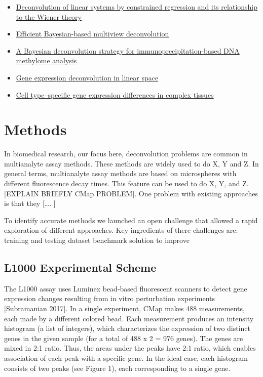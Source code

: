 \documentclass[]{article}
\begin{document}
\begin{itemize}
\item
  \href{https://ieeexplore.ieee.org/abstract/document/4044778}{Deconvolution
  of linear systems by constrained regression and its relationship to
  the Wiener theory}
\item
  \href{https://www.nature.com/articles/nmeth.2929}{Efficient
  Bayesian-based multiview deconvolution}
\item
  \href{https://www.nature.com/articles/nbt1414}{A Bayesian
  deconvolution strategy for immunoprecipitation-based DNA methylome
  analysis}
\item
  \href{https://www.nature.com/articles/nmeth.1830}{Gene expression
  deconvolution in linear space}
\item
  \href{https://www.nature.com/articles/nmeth.1439}{Cell type--specific
  gene expression differences in complex tissues}
\end{itemize}

\hypertarget{methods-1}{%
\section{Methods}\label{methods-1}}

In biomedical research, our focus here, deconvolution problems are
common in multianalyte assay methods. These methods are widely used to
do X, Y and Z. In general terms, multianalyte assay methods are based on
microspheres with different fluorescence decay times. This feature can
be used to do X, Y, and Z. {[}EXPLAIN BRIEFLY CMap PROBLEM{]}. One
problem with existing approaches is that they {[}\ldots. {]}

To identify accurate methods we launched an open challenge that allowed
a rapid exploration of different approaches. Key ingredients of there
challenges are: training and testing dataset benchmark solution to
improve

\hypertarget{l1000-experimental-scheme-1}{%
\subsection{L1000 Experimental
Scheme}\label{l1000-experimental-scheme-1}}

The L1000 assay uses Luminex bead-based fluorescent scanners to detect
gene expression changes resulting from in vitro perturbation experiments
{[}Subramanian 2017{]}. In a single experiment, CMap makes 488
measurements, each made by a different colored bead. Each measurement
produces an intensity histogram (a list of integers), which
characterizes the expression of two distinct genes in the given sample
(for a total of 488 x 2 = 976 genes). The genes are mixed in 2:1 ratio.
Thus, the areas under the peaks have 2:1 ratio, which enables
association of each peak with a specific gene. In the ideal case, each
histogram consists of two peaks (see Figure 1), each corresponding to a
single gene.
\end{document}

